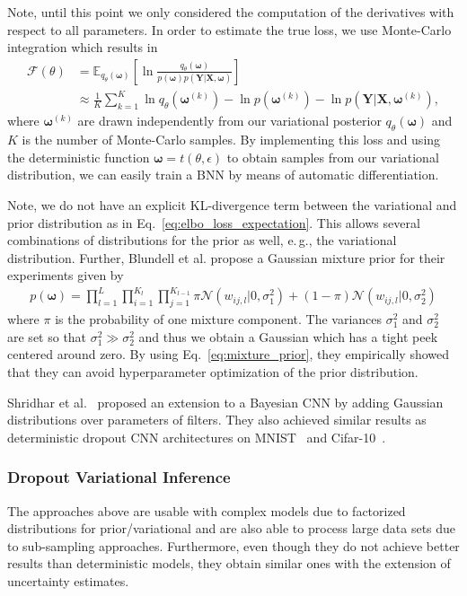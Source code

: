 \documentclass[runningheads]{llncs}
\begin{document}
Note, until this point we only considered the computation of the derivatives with respect to all parameters.
In order to estimate the true loss, we use Monte-Carlo integration which results in
\begin{align}
    \mathcal{F}(\theta) &=  \mathbb{E}_{q_\theta(\boldsymbol{\omega})}\left[ \ln \frac{q_\theta(\boldsymbol{\omega})}{p(\boldsymbol{\omega})p(\mathbf{Y} | \mathbf{X}, \boldsymbol{\omega})} \right]\label{eq:applied_reparam} \\
    &\approx \frac{1}{K}\sum_{k=1}^K \ln q_\theta(\boldsymbol{\omega}^{(k)}) - \ln p(\boldsymbol{\omega}^{(k)}) - \ln p(\mathbf{Y} | \mathbf{X}, \mathbf{\boldsymbol{\omega}}^{(k)}), 
\end{align}
where $\boldsymbol{\omega}^{(k)}$ are drawn independently from our variational posterior $q_\theta(\boldsymbol{\omega})$ and $K$ is the number of Monte-Carlo samples.
By implementing this loss and using the deterministic function $\boldsymbol{\omega} = t(\theta, \epsilon)$ to obtain samples from our variational distribution, we can easily train a BNN by means of automatic differentiation.

Note, we do not have an explicit KL-divergence term between the variational and prior distribution as in Eq.~\ref{eq:elbo_loss_expectation}.
This allows several combinations of distributions for the prior as well, e.\,g., the variational distribution.
Further, Blundell et al. propose a Gaussian mixture prior for their experiments given by
\begin{align}
    p(\boldsymbol{\omega}) = \prod_{l=1}^{L}\prod_{i=1}^{K_l}\prod_{j=1}^{K_{l-1}} \pi\mathcal{N}(w_{ij,l} | 0, \sigma_1^2) + (1 - \pi)\mathcal{N}(w_{ij,l}| 0, \sigma_2^2)\label{eq:mixture_prior}
\end{align}
where $\pi$ is the probability of one mixture component. 
The variances $\sigma_1^2$ and $\sigma_2^2$ are set so that $\sigma_1^2 \gg \sigma_2^2$ and thus we obtain a Gaussian which has a tight peek centered around zero.
By using Eq.~\ref{eq:mixture_prior}, they empirically showed that they can avoid hyperparameter optimization of the prior distribution.

Shridhar et al.~\cite{shridhar2019comprehensive} proposed an extension to a Bayesian CNN by adding Gaussian distributions over parameters of filters.
They also achieved similar results as deterministic dropout CNN architectures on MNIST~\cite{lecun-mnisthandwrittendigit-2010} and Cifar-10~\cite{cifar}.

\subsubsection{Dropout Variational Inference}
\label{sec:dropout_inference}
The approaches above are usable with complex models due to factorized distributions for prior/variational and are also able to process large data sets due to sub-sampling approaches.
Furthermore, even though they do not achieve better results than deterministic models, they obtain similar ones with the extension of uncertainty estimates.
\end{document}
